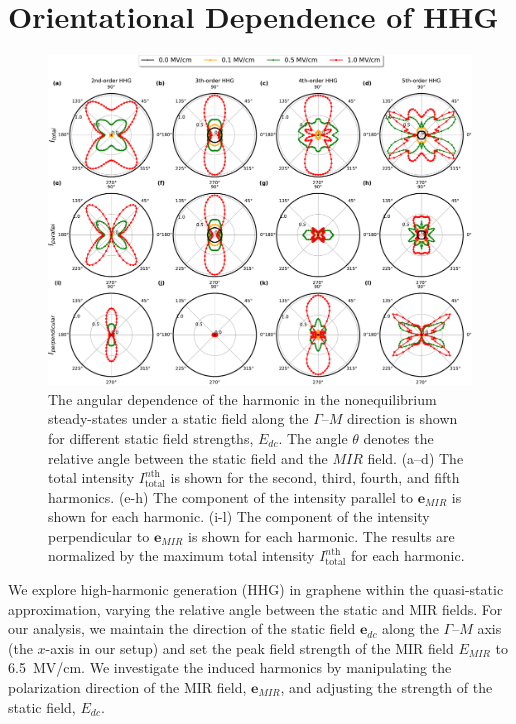 \section{Orientational Dependence of HHG}
\begin{figure}[tp]
	\centering
	\includegraphics[width=1.0\linewidth]{pic/polar.pdf}
	\caption{\label{fig:polar}
		The angular dependence of the harmonic  in the nonequilibrium steady-states under a static field along the $\Gamma$--$M$ direction is shown for different static field strengths, $E_{dc}$. The angle $\theta$ denotes the relative angle between the static field and the $MIR$ field. (a--d) The total intensity $I^{n \textrm{th}}_{\mathrm{total}}$ is shown for the second, third, fourth, and fifth harmonics. (e-h) The component of the intensity parallel to $\mathbf e_{MIR}$ is shown for each harmonic. (i-l) The component of the intensity perpendicular to $\mathbf e_{MIR}$ is shown for each harmonic. The results are normalized by the maximum total intensity $I^{n \textrm{th}}_{\mathrm{total}}$ for each harmonic.
	}
\end{figure}

We explore high-harmonic generation (HHG) in graphene within the quasi-static approximation, varying the relative angle between the static and MIR fields. For our analysis, we maintain the direction of the static field $\mathbf e_{dc}$ along the $\Gamma$--$M$ axis (the $x$-axis in our setup) and set the peak field strength of the MIR field $E_{MIR}$ to 6.5~MV/cm. We investigate the induced harmonics by manipulating the polarization direction of the MIR field, $\mathbf e_{MIR}$, and adjusting the strength of the static field, $E_{dc}$.

